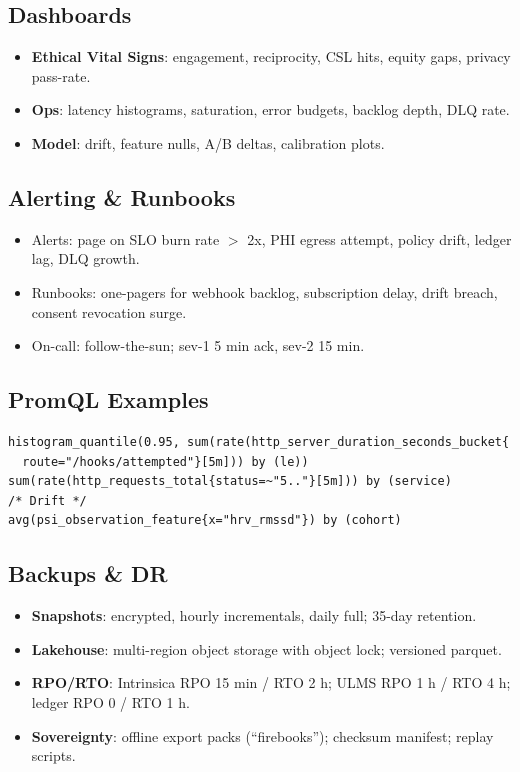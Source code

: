 \documentclass[11pt]{article}
\theoremstyle{plain}
\begin{document}
\subsection{Dashboards}
\begin{itemize}
  \item \textbf{Ethical Vital Signs}: engagement, reciprocity, CSL hits, equity gaps, privacy pass-rate.
  \item \textbf{Ops}: latency histograms, saturation, error budgets, backlog depth, DLQ rate.
  \item \textbf{Model}: drift, feature nulls, A/B deltas, calibration plots.
\end{itemize}

\subsection{Alerting \& Runbooks}
\begin{itemize}
  \item Alerts: page on SLO burn rate $>$ 2x, PHI egress attempt, policy drift, ledger lag, DLQ growth.
  \item Runbooks: one-pagers for webhook backlog, subscription delay, drift breach, consent revocation surge.
  \item On-call: follow-the-sun; sev-1 5 min ack, sev-2 15 min.
\end{itemize}

\subsection{PromQL Examples}
\begin{verbatim}
histogram_quantile(0.95, sum(rate(http_server_duration_seconds_bucket{
  route="/hooks/attempted"}[5m])) by (le))
sum(rate(http_requests_total{status=~"5.."}[5m])) by (service)
/* Drift */
avg(psi_observation_feature{x="hrv_rmssd"}) by (cohort)
\end{verbatim}

\subsection{Backups \& DR}
\begin{itemize}
  \item \textbf{Snapshots}: encrypted, hourly incrementals, daily full; 35-day retention.
  \item \textbf{Lakehouse}: multi-region object storage with object lock; versioned parquet.
  \item \textbf{RPO/RTO}: Intrinsica RPO 15 min / RTO 2 h; ULMS RPO 1 h / RTO 4 h; ledger RPO 0 / RTO 1 h.
  \item \textbf{Sovereignty}: offline export packs (“firebooks”); checksum manifest; replay scripts.
\end{itemize}
\end{document}

